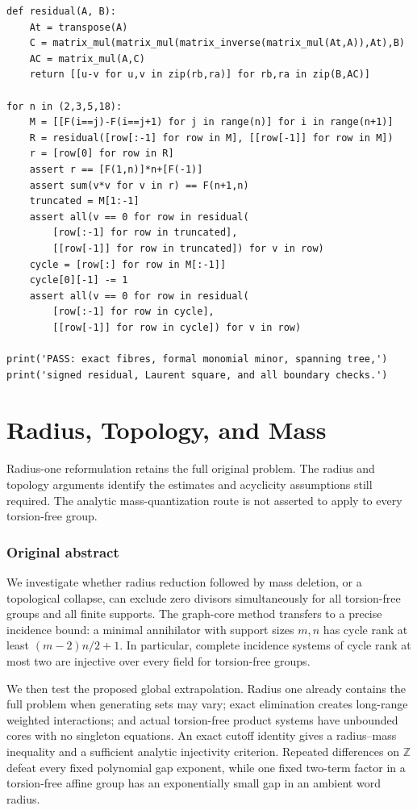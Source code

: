 \documentclass[11pt,a4paper,oneside]{report}
\theoremstyle{definition}
\theoremstyle{remark}
\newcommand{\Z}{\mathbb Z}
\newcommand{\compilationnote}[1]{\medskip\noindent{\small\color{accent}\textbf{Compilation note --- 23 November 2026.}}\par
{\small #1}\par\medskip}
\begin{document}
\begin{lstlisting}
def residual(A, B):
    At = transpose(A)
    C = matrix_mul(matrix_mul(matrix_inverse(matrix_mul(At,A)),At),B)
    AC = matrix_mul(A,C)
    return [[u-v for u,v in zip(rb,ra)] for rb,ra in zip(B,AC)]

for n in (2,3,5,18):
    M = [[F(i==j)-F(i==j+1) for j in range(n)] for i in range(n+1)]
    R = residual([row[:-1] for row in M], [[row[-1]] for row in M])
    r = [row[0] for row in R]
    assert r == [F(1,n)]*n+[F(-1)]
    assert sum(v*v for v in r) == F(n+1,n)
    truncated = M[1:-1]
    assert all(v == 0 for row in residual(
        [row[:-1] for row in truncated],
        [[row[-1]] for row in truncated]) for v in row)
    cycle = [row[:] for row in M[:-1]]
    cycle[0][-1] -= 1
    assert all(v == 0 for row in residual(
        [row[:-1] for row in cycle],
        [[row[-1]] for row in cycle]) for v in row)

print('PASS: exact fibres, formal monomial minor, spanning tree,')
print('signed residual, Laurent square, and all boundary checks.')
\end{lstlisting}

\chapter{Radius, Topology, and Mass}\label{chap:M07}
\par
\compilationnote{Radius-one reformulation retains the full original problem. The
radius and topology arguments identify the estimates and acyclicity
assumptions still required. The analytic mass-quantization route is not
asserted to apply to every torsion-free group.}
\subsection*{Original abstract}
We investigate whether radius reduction followed by mass deletion, or
a topological collapse, can exclude zero divisors simultaneously for
all torsion-free groups and all finite supports. The graph-core method
transfers to a precise incidence bound: a minimal annihilator with
support sizes $m,n$ has cycle rank at least $(m-2)n/2+1$.
In particular, complete incidence systems of cycle rank at most two
are injective over every field for torsion-free groups.

We then test the proposed global extrapolation. Radius one already
contains the full problem when generating sets may vary; exact
elimination creates long-range weighted interactions; and actual
torsion-free product systems have unbounded cores with no singleton
equations. An exact cutoff identity gives a radius--mass inequality
and a sufficient analytic injectivity criterion. Repeated differences
on $\Z$ defeat every fixed polynomial gap exponent, while one fixed
two-term factor in a torsion-free affine group has an exponentially
small gap in an ambient word radius.
\end{document}
